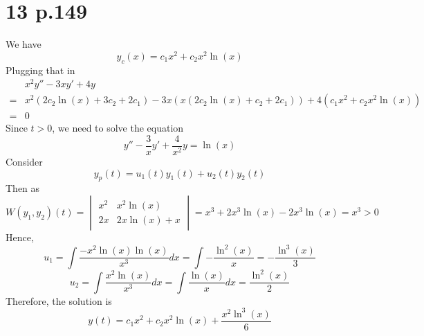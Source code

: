 \documentclass[11pt]{article}
\begin{document}
\section*{13 p.149}
We have 
\[
    y_c(x) = c_1x^2 + c_2x^2\ln(x)   
\]
Plugging that in 
\begin{equation*}
    \begin{aligned}
        &x^2y'' -3xy' + 4y \\
        =& x^2(2c_2\ln\left(x\right)+3c_2+2c_1) - 3x(x\left(2c_2\ln\left(x\right)+c_2+2c_1\right)) + 4(c_1x^2 + c_2x^2\ln(x)) \\
        =& 0
    \end{aligned}
\end{equation*}
Since $t>0$, we need to solve the equation 
\[
    y'' - \frac{3}{x}y' + \frac{4}{x^2}y = \ln(x)   
\]
Consider 
\[y_p(t) = u_1(t) y_1(t) + u_2(t)y_2(t)\]
Then as 
\[
    W(y_1,y_2)(t) = 
    \begin{vmatrix}
        x^2 & x^2\ln(x) \\
        2x & 2x\ln(x) + x
    \end{vmatrix} = x^3 + 2x^3\ln(x) - 2x^3\ln(x) = x^3 >0
\]
Hence, 
\[
    u_1 = \int \frac{-x^2\ln(x) \ln(x)}{x^3} dx = \int -\frac{\ln^2(x)}{x}= -\frac{\ln^3(x)}{3}
\]
\[
    u_2 = \int \frac{x^2 \ln(x)}{x^3} dx = \int \frac{\ln(x)}{x} dx = \frac{\ln^2(x)}{2}
\]
Therefore, the solution is 
\[
    y(t) =  c_1x^2 + c_2x^2\ln(x) + \frac{x^2\ln^3(x)}{6} 
\]
\end{document}
